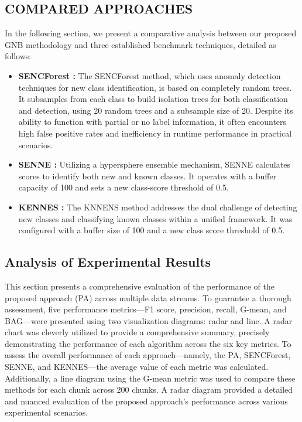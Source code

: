 \subsection{COMPARED APPROACHES}
In the following section, we present a comparative analysis between our proposed GNB methodology and three established benchmark techniques, detailed as follows:
\begin{itemize}
  \item \textbf{SENCForest \cite{mu2017classification}:} The SENCForest method, which uses anomaly detection techniques for new class identification, is based on completely random trees. It subsamples from each class to build isolation trees for both classification and detection, using 20 random trees and a subsample size of 20. Despite its ability to function with partial or no label information, it often encounters high false positive rates and inefficiency in runtime performance in practical scenarios.
  \item \textbf{SENNE \cite{zhu2020semi}:} Utilizing a hypersphere ensemble mechanism, SENNE calculates scores to identify both new and known classes. It operates with a buffer capacity of 100 and sets a new class-score threshold of 0.5.
  \item  \textbf{KENNES \cite{zhang2022knnens}:} The KNNENS method addresses the dual challenge of detecting new classes and classifying known classes within a unified framework. It was configured with a buffer size of 100 and a new class score threshold of 0.5.
\end{itemize}
\subsection{Analysis of Experimental Results}
This section presents a comprehensive evaluation of the performance of the proposed approach (PA) across multiple data streams. To guarantee a thorough assessment, five performance metrics—F1 score, precision, recall, G-mean, and BAG—were presented using two visualization diagrams: radar and line. A radar chart was cleverly utilized to provide a comprehensive summary, precisely demonstrating the performance of each algorithm across the six key metrics. To assess the overall performance of each approach—namely, the PA, SENCForest, SENNE, and KENNES—the average value of each metric was calculated. Additionally, a line diagram using the G-mean metric was used to compare these methods for each chunk across 200 chunks. A radar diagram provided a detailed and nuanced evaluation of the proposed approach’s performance across various experimental scenarios.
